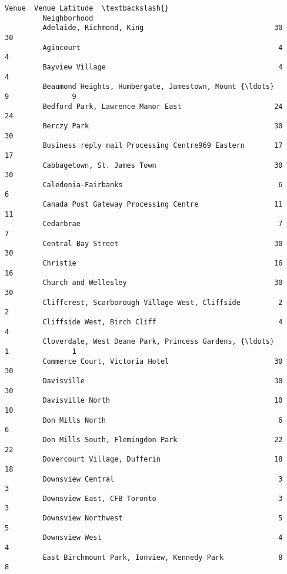 \documentclass[11pt]{article}
\begin{document}
\begin{Verbatim}[commandchars=\\\{\}]
                                                             Venue  Venue Latitude  \textbackslash{}
         Neighborhood                                                                
         Adelaide, Richmond, King                               30              30   
         Agincourt                                               4               4   
         Bayview Village                                         4               4   
         Beaumond Heights, Humbergate, Jamestown, Mount {\ldots}      9               9   
         Bedford Park, Lawrence Manor East                      24              24   
         Berczy Park                                            30              30   
         Business reply mail Processing Centre969 Eastern       17              17   
         Cabbagetown, St. James Town                            30              30   
         Caledonia-Fairbanks                                     6               6   
         Canada Post Gateway Processing Centre                  11              11   
         Cedarbrae                                               7               7   
         Central Bay Street                                     30              30   
         Christie                                               16              16   
         Church and Wellesley                                   30              30   
         Cliffcrest, Scarborough Village West, Cliffside         2               2   
         Cliffside West, Birch Cliff                             4               4   
         Cloverdale, West Deane Park, Princess Gardens, {\ldots}      1               1   
         Commerce Court, Victoria Hotel                         30              30   
         Davisville                                             30              30   
         Davisville North                                       10              10   
         Don Mills North                                         6               6   
         Don Mills South, Flemingdon Park                       22              22   
         Dovercourt Village, Dufferin                           18              18   
         Downsview Central                                       3               3   
         Downsview East, CFB Toronto                             3               3   
         Downsview Northwest                                     5               5   
         Downsview West                                          4               4   
         East Birchmount Park, Ionview, Kennedy Park             8               8   

\end{Verbatim}
\end{document}
